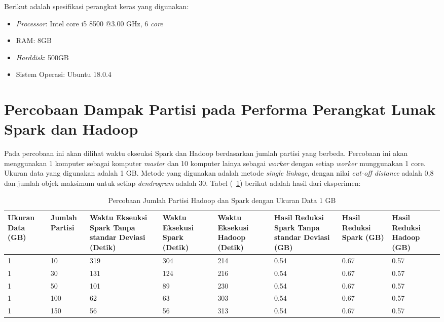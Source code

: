 Berikut adalah spesifikasi perangkat keras yang digunakan:

\begin{itemize}

\item \textit{Processor}: Intel core i5 8500 @3.00 GHz, 6 \textit{core}

\item RAM: 8GB

\item \textit{Harddisk}: 500GB

\item Sistem Operasi: Ubuntu 18.0.4

\end{itemize}






\section{Percobaan Dampak Partisi pada Performa Perangkat Lunak Spark dan Hadoop} 

Pada percobaan ini akan dilihat waktu ekseuksi Spark dan Hadoop berdasarkan jumlah partisi yang berbeda. Percobaan ini akan menggunakan 1 komputer sebagai komputer \textit{master} dan 10 komputer lainya sebagai \textit{worker} dengan setiap \textit{worker} munggunakan 1 core. Ukuran data yang digunakan adalah 1 GB. Metode yang digunakan adalah metode \textit{single linkage}, dengan nilai \textit{cut-off distance} adalah 0,8 dan jumlah objek maksimum untuk setiap \textit{dendrogram} adalah 30. Tabel (~\ref{tab:spark1}) berikut adalah hasil dari eksperimen:

\begin{table}[H] 
	\centering 
	\caption{Percobaan Jumlah Partisi Hadoop dan Spark dengan Ukuran Data 1 GB}
	\label{tab:spark1}
	\begin{tabular}{|p{1.1cm}|p{1.1cm}|p{2.5cm}|p{2.5cm}|p{2.5cm}|p{2cm}|p{1.5cm}|p{1.5cm}|}
\hline
Ukuran Data (GB) & Jumlah Partisi &  Waktu Ekseuksi Spark Tanpa standar Deviasi (Detik) & Waktu Eksekusi Spark (Detik) & Waktu Eksekusi Hadoop (Detik) & Hasil Reduksi Spark Tanpa standar Deviasi (GB) & Hasil Reduksi Spark (GB)  & Hasil Reduksi Hadoop (GB)\\ 
\hline
1 & 10 & 319 & 304 & 214 & 0.54 & 0.67 & 0.57 \\
\hline
1 & 30 & 131 & 124 & 216 & 0.54 & 0.67 & 0.57 \\
\hline
1 & 50 & 101 & 89 & 230 & 0.54 & 0.67 & 0.57 \\
\hline
1 & 100 & 62 & 63 & 303 & 0.54 & 0.67 & 0.57 \\
\hline
1 & 150 & 56 & 56 & 313 & 0.54 & 0.67 & 0.57 \\
\hline

\hline

	\end{tabular} 
\end{table}




